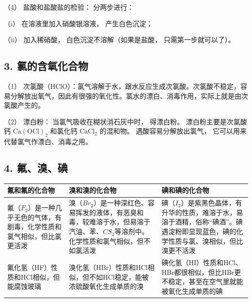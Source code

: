 （4） 盐酸和盐酸盐的检验： 分两步进行：

（i） 在溶液里加入硝酸银溶液， 产生白色沉淀；

（ii） 加入稀硝酸， 白色沉淀不溶解（如果是盐酸， 只需第一步就可以了）。

\subsection{3. 氯的含氧化合物}

（1）
次氯酸（HClO）：氯气溶解于水，跟水反应生成次氯酸。次氯酸不稳定，容易分解放出氧气，因此有很强的氧化性。氯水的漂白、消毒作用，实际上就是由次氯酸产生的。

（2） 漂白粉： 当氯气吸收在糊状消石灰中时， 得漂白粉。
漂白粉主要是次氯酸钙 \(\mathrm{Ca(OCl)}_{2}\) 和氯化钙
\(\mathrm{CaCl}_{2}\) 的混和物。 遇酸容易分解放出氯气，
它可以用来代替氯气作漂白、消毒之用。

\subsection{4. 氟、溴、碘}

{\def\LTcaptype{none} %
\begin{longtable}[]{@{}
  >{\raggedright\arraybackslash}p{}
  >{\raggedright\arraybackslash}p{}
  >{\raggedright\arraybackslash}p{}@{}}
\toprule\noalign{}
\begin{minipage}[b]{\linewidth}\raggedright
氟和氟的化合物
\end{minipage} & \begin{minipage}[b]{\linewidth}\raggedright
溴和溴的化合物
\end{minipage} & \begin{minipage}[b]{\linewidth}\raggedright
碘和碘的化合物
\end{minipage} \\
\midrule\noalign{}
\endhead
\bottomrule\noalign{}
\endlastfoot
氟（\(F_2\)）是一种几乎无色的气体，有剧毒，化学性质和氯气相似，但比氯更活泼
&
溴（\(Br_2\)）是一种深红色、容易挥发的液体，有恶臭和毒，较难溶于水，但易溶于汽油、苯、\(CS_2\)等溶剂中。化学性质和氯气相似，但不如氯活泼
&
碘（\(I_2\)）是紫黑色晶体，有升华的性质，难溶于水，易溶于酒精，俗称``碘酒''。碘遇淀粉即显现蓝色，碘的化学性质与氯、溴相似，但比溴更不活泼 \\
氟化氢（HF）性质和HCl相似，但能腐蚀玻璃 &
溴化氢（HBr）性质和HCl相似，但不如HCl稳定，能被浓硫酸氧化生成单质的溴 &
碘化氢（HI）性质和HCl、HBr都很相似，但比HBr更不稳定，甚至在空气里就能被氧化生成单质的碘 \\
\end{longtable}
}

